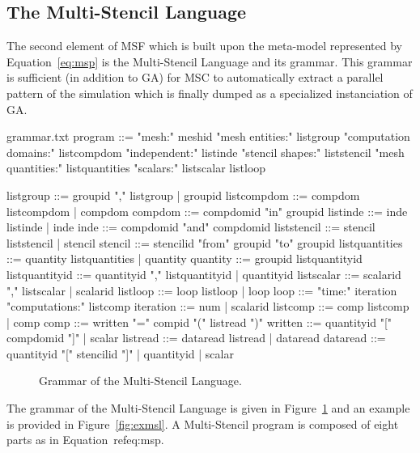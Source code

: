 \subsection{The Multi-Stencil Language}

The second element of MSF which is built upon the meta-model represented by Equation~\ref{eq:msp} is the Multi-Stencil Language and its grammar. This grammar is sufficient (in addition to GA) for MSC to automatically extract a parallel pattern of the simulation which is finally dumped as a specialized instanciation of GA.

\begin{filecontents*}{grammar.txt}
program ::= "mesh:" meshid 
            "mesh entities:" listgroup
            "computation domains:" listcompdom
            "independent:" listinde
            "stencil shapes:" liststencil
            "mesh quantities:" listquantities
            "scalars:" listscalar
            listloop

listgroup ::= groupid "," listgroup | groupid
listcompdom ::= compdom listcompdom | compdom
compdom ::= compdomid "in" groupid
listinde ::= inde listinde | inde
inde ::= compdomid "and" compdomid
liststencil ::= stencil liststencil | stencil
stencil ::= stencilid "from" groupid "to" groupid
listquantities ::= quantity listquantities |  quantity
quantity ::= groupid listquantityid
listquantityid ::= quantityid "," listquantityid |  quantityid
listscalar ::= scalarid "," listscalar | scalarid
listloop ::= loop listloop | loop
loop ::=  "time:" iteration
          "computations:" listcomp
iteration ::= num | scalarid
listcomp ::= comp listcomp |  comp
comp ::= written "=" compid "(" listread ")"
written ::= quantityid "[" compdomid "]" | scalar
listread ::= dataread listread | dataread
dataread ::= quantityid "[" stencilid "]" |  quantityid | scalar
\end{filecontents*}

\begin{figure}[hbt]
  \hspace{5mm}
  \begin{minipage}[!h]{0.98\textwidth}
    {}   
    \caption{Grammar of the Multi-Stencil Language. \label{fig:grammar}}
  \end{minipage}
\end{figure}

The grammar of the Multi-Stencil Language is given in Figure~\ref{fig:grammar} and an example is provided in Figure~\ref{fig:exmsl}. A Multi-Stencil program is composed of eight parts as in Equation~ref{eq:msp}.

